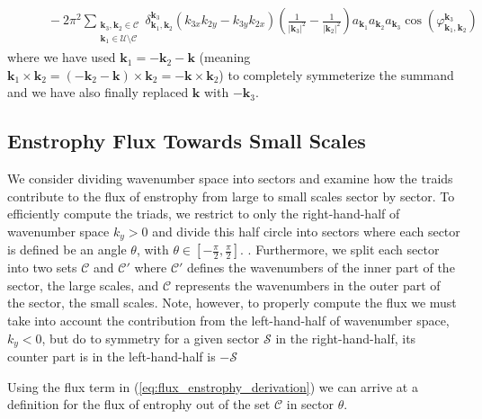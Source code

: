 \documentclass[9pt]{article}
\newcommand{\bfk}{\mathbf{k}}								%
\newcommand{\bfkn}[1]{\mathbf{k}_{#1}}								%
\begin{document}
\begin{align}
&\qquad  - 2\pi^2	\sum_{\substack{\bfkn{3}, \bfkn{2} \in \mathcal{C} \\  \bfkn{1} \in \mathcal{U}\setminus \mathcal{C}}}\delta_{\bfkn{1}, \bfkn{2}}^{\bfkn{3}}\left(k_{3x}k_{2y} - k_{3y}k_{2x}\right) \left(\frac{1}{|\bfkn{3}|^2} - \frac{1}{|\bfkn{2}|^2}\right) a_{\bfkn{1}} a_{\bfkn{2}} a_{\bfkn{3}} \cos(\varphi_{\bfkn{1}, \bfkn{2}}^{\bfkn{3}})
\label{eq:flux_enstrophy_derivation}
\end{align}
where we have used $\bfkn{1} = - \bfkn{2} - \bfk$ (meaning $\bfkn{1} \times \bfkn{2} = (- \bfkn{2} - \bfk) \times \bfkn{2} = - \bfk \times \bfkn{2}$) to completely symmeterize the summand and we have also finally replaced $\bfk$ with $-\bfkn{3}$.


\subsection{Enstrophy Flux Towards Small Scales}

We consider dividing wavenumber space into sectors and examine how the traids contribute to the flux of enstrophy from large to small scales sector by sector. To efficiently compute the triads, we restrict to only the right-hand-half of wavenumber space $k_{y} > 0$ and divide this half circle into sectors where each sector is defined be an angle $\theta$, with $\theta \in [-\frac{\pi}{2}, \frac{\pi}{2}]$. . Furthermore, we split each sector into two sets $\mathcal{C}$ and $\mathcal{C}{'}$ where $\mathcal{C}{'}$ defines the wavenumbers of the inner part of the sector, the large scales, and $\mathcal{C}$ represents the wavenumbers in the outer part of the sector, the small scales. Note, however, to properly compute the flux we must take into account the contribution from the left-hand-half of wavenumber space, $k_y < 0$, but do to symmetry for a given sector $\mathcal{S}$ in the right-hand-half, its counter part is in the left-hand-half is $-\mathcal{S}$

Using the flux term in (\ref{eq:flux_enstrophy_derivation}) we can arrive at a definition for the flux of entrophy out of the set $\mathcal{C}$ in sector $\theta$.	
\end{document}
